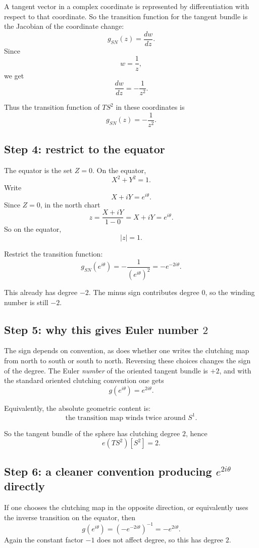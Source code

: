 \documentclass[11pt]{article}
\begin{document}
	A tangent vector in a complex coordinate is represented by differentiation with respect to that coordinate. So the transition function for the tangent bundle is the Jacobian of the coordinate change:
	\[
	g_{SN}(z)=\frac{dw}{dz}.
	\]
	Since
	\[
	w=\frac{1}{z},
	\]
	we get
	\[
	\frac{dw}{dz}=-\frac{1}{z^2}.
	\]
	
	Thus the transition function of \(TS^2\) in these coordinates is
	\[
	g_{SN}(z)=-\frac{1}{z^2}.
	\]
	
	\subsection*{Step 4: restrict to the equator}
	
	The equator is the set \(Z=0\). On the equator,
	\[
	X^2+Y^2=1.
	\]
	Write
	\[
	X+iY=e^{i\theta}.
	\]
	Since \(Z=0\), in the north chart
	\[
	z=\frac{X+iY}{1-0}=X+iY=e^{i\theta}.
	\]
	So on the equator,
	\[
	|z|=1.
	\]
	
	Restrict the transition function:
	\[
	g_{SN}(e^{i\theta})
	=
	-\frac{1}{(e^{i\theta})^2}
	=
	- e^{-2i\theta}.
	\]
	
	This already has degree \(-2\). The minus sign contributes degree \(0\), so the winding number is still \(-2\).
	
	\subsection*{Step 5: why this gives Euler number \(2\)}
	
	The sign depends on convention, as does whether one writes the clutching map from north to south or south to north. Reversing these choices changes the sign of the degree. The Euler \emph{number} of the oriented tangent bundle is \(+2\), and with the standard oriented clutching convention one gets
	\[
	g(e^{i\theta})=e^{2i\theta}.
	\]
	
	Equivalently, the absolute geometric content is:
	\[
	\text{the transition map winds twice around }S^1.
	\]
	
	So the tangent bundle of the sphere has clutching degree \(2\), hence
	\[
	e(TS^2)[S^2]=2.
	\]
	
	\subsection*{Step 6: a cleaner convention producing \(e^{2i\theta}\) directly}
	
	If one chooses the clutching map in the opposite direction, or equivalently uses the inverse transition on the equator, then
	\[
	g(e^{i\theta})
	=
	\left(-e^{-2i\theta}\right)^{-1}
	=
	- e^{2i\theta}.
	\]
	Again the constant factor \(-1\) does not affect degree, so this has degree \(2\).
	
\end{document}
